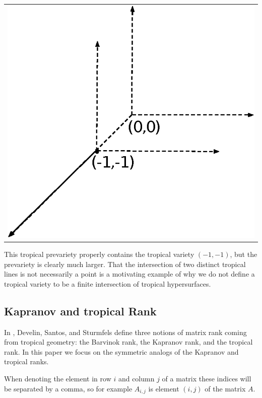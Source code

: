 \documentclass{article}
\begin{document}
\vspace{.1 in}
\begin{tabular}{c}
  \centering
  \hspace{1in}\includegraphics[scale=1]{Two-Tropical-Lines-Intersecting-at-a-Ray.eps}
\end{tabular}

This tropical prevariety properly contains the tropical variety $(-1,-1)$, but the prevariety is clearly much larger. That the intersection of two distinct tropical lines is not necessarily a point is a motivating example of why we do not define a tropical variety to be a finite intersection of tropical hypersurfaces.

\subsection{Kapranov and tropical Rank}

In \cite{dss}, Develin, Santos, and Sturmfels define three notions of matrix rank coming from tropical geometry: the Barvinok rank, the Kapranov rank, and the tropical rank. In this paper we focus on the symmetric analogs of the Kapranov and tropical ranks.

When denoting the element in row $i$ and column $j$ of a matrix these indices will be separated by a comma, so for example $A_{i,j}$ is element $(i,j)$ of the matrix $A$.
\end{document}
